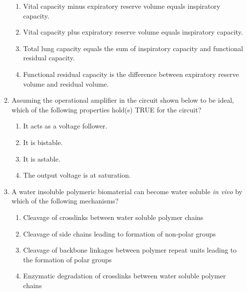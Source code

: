 \documentclass[journal]{IEEEtran}
\begin{document}
\begin{enumerate}
\begin{enumerate}[label=(\Alph*)]
    \item Vital capacity minus expiratory reserve volume equals inspiratory capacity.
    \item Vital capacity plus expiratory reserve volume equals inspiratory capacity.
    \item Total lung capacity equals the sum of inspiratory capacity and functional residual capacity.
    \item Functional residual capacity is the difference between expiratory reserve volume and residual volume.
\end{enumerate}
\hfill{}

\item 
Assuming the operational amplifier in the circuit shown below to be ideal, which of the following properties hold(s) TRUE for the circuit?

\begin{figure}[H]
\centering
{}%

\label{fig:my_label}
\end{figure}

\begin{enumerate}[label=(\Alph*)]
    \item It acts as a voltage follower.
    \item It is bistable.
    \item It is astable.
    \item The output voltage is at saturation.
\end{enumerate}
\hfill{}
 \item 
 
A water insoluble polymeric biomaterial can become water soluble \textit{in vivo} by which of the following mechanisms?

\begin{enumerate}[label=(\Alph*)]
    \item Cleavage of crosslinks between water soluble polymer chains
    \item Cleavage of side chains leading to formation of non-polar groups
    \item Cleavage of backbone linkages between polymer repeat units leading to the formation of polar groups
    \item Enzymatic degradation of crosslinks between water soluble polymer chains
\end{enumerate}
\hfill{}


\end{enumerate}
\end{document}
